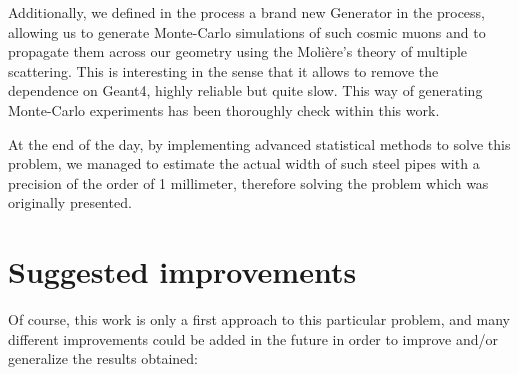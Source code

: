 \documentclass[a4paper, 11pt, twoside, openright]{report}
\begin{document}
Additionally, we defined in the process a brand new Generator in the process, allowing us to generate Monte-Carlo simulations of such cosmic muons and to propagate them across our geometry using the Moli\`ere's theory of multiple scattering. This is interesting in the sense that it allows to remove the dependence on Geant4, highly reliable but quite slow. This way of generating Monte-Carlo experiments has been thoroughly check within this work. 

At the end of the day, by implementing advanced statistical methods to solve this problem, we managed to estimate the actual width of such steel pipes with a precision of the order of 1 millimeter, therefore solving the problem which was originally presented.

\section{Suggested improvements}

Of course, this work is only a first approach to this particular problem, and many different improvements could be added in the future in order to improve and/or generalize the results obtained:
\end{document}
